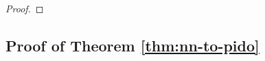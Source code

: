 \documentclass{article}
\numberwithin{equation}{section}
\newcommand{\cG}{\mathcal{G}}
\newcommand{\cL}{\mathcal{L}}
\newcommand{\cQ}{\mathcal{Q}}
\newcommand{\cW}{\mathcal{W}}
\renewcommand{\epsilon}{\varepsilon}
\newcommand{\1}{\mathbbm{1}}
\newcommand{\Fhat}{\widehat{F}}
\newcommand{\cGhat}{{\widehat{\cG}}}
\newcommand{\cQhat}{{\widehat{\cQ}}}
\newcommand{\bigO}{\mathcal{O}}
\begin{document}
\begin{proof}
\end{proof}

\subsection{Proof of Theorem \ref{thm:nn-to-pido}}\label{app:nn-to-pido}
\end{document}
